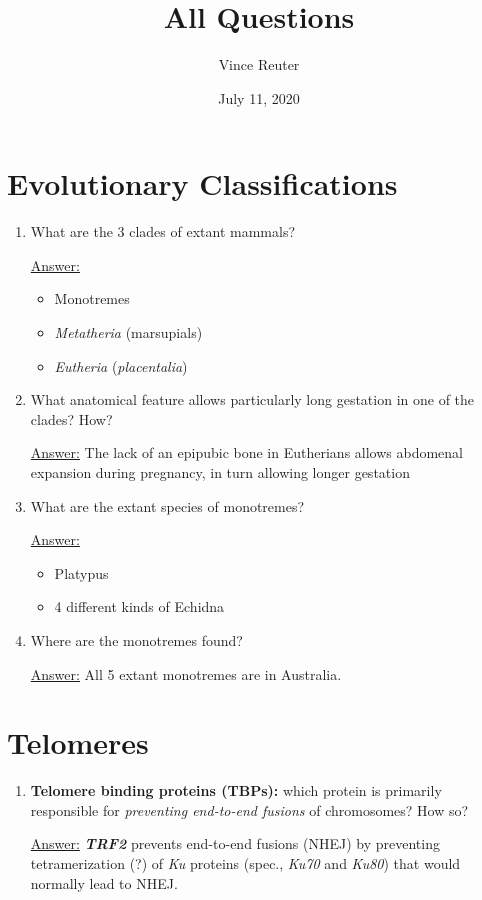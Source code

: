 \documentclass{article}
\title{All Questions}
\author{Vince Reuter}
\date{July 11, 2020}
\newenvironment{QandA}{\begin{enumerate}[label=\bfseries Q\arabic*.]}
                       {\end{enumerate}}
\newenvironment{answered}{\par\normalfont\underline{Answer:}}{}
\begin{document}
\maketitle

\section{Evolutionary Classifications}
\begin{QandA}
  \item{What are the 3 clades of extant mammals?}
    \begin{answered}
    \begin{itemize}
      \item{Monotremes}
      \item{\textit{Metatheria} (marsupials)}
      \item{\textit{Eutheria} (\textit{placentalia})}
    \end{itemize}
    \end{answered}
  \item{What anatomical feature allows particularly long gestation in one of the clades? How?}
    \begin{answered}
    The lack of an epipubic bone in Eutherians allows abdomenal expansion during pregnancy, in turn allowing longer gestation
    \end{answered}
  \item{What are the extant species of monotremes?}
    \begin{answered}
    \begin{itemize}
      \item{Platypus}
      \item{4 different kinds of Echidna}
    \end{itemize}
    \end{answered}
  \item{Where are the monotremes found?}
    \begin{answered}
    All 5 extant monotremes are in Australia.
    \end{answered}
\end{QandA}
\section{Telomeres}
\begin{QandA}
  \item{\textbf{Telomere binding proteins (TBPs):} which protein is primarily responsible for \textit{preventing end-to-end fusions} of chromosomes? How so?}
    \begin{answered}
    \textbf{\textit{TRF2}} prevents end-to-end fusions (NHEJ) by preventing tetramerization (?) of \textit{Ku} proteins (spec., \textit{Ku70} and \textit{Ku80}) that would normally lead to NHEJ.
    \end{answered}
\end{QandA}
\end{document}
